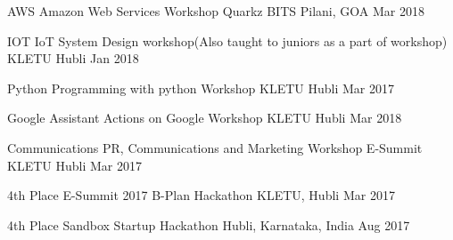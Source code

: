 




\begin{cvhonors}


\cvhonor
{AWS} %
{Amazon Web Services Workshop Quarkz} %
{BITS Pilani, GOA} %
{Mar 2018} %


\cvhonor
{IOT} %
{IoT System Design workshop(Also taught to juniors as a part of workshop)} %
{KLETU Hubli} %
{Jan 2018} %


\cvhonor
{Python} %
{Programming with python Workshop} %
{KLETU Hubli} %
{Mar 2017} %


\cvhonor
{Google Assistant} %
{Actions on Google Workshop} %
{KLETU Hubli} %
{Mar 2018} %


\cvhonor
{Communications} %
{PR, Communications and Marketing Workshop E-Summit} %
{KLETU Hubli} %
{Mar 2017} %


\end{cvhonors}



\begin{cvhonors}


\cvhonor
{4th Place} %
{E-Summit 2017 B-Plan Hackathon} %
{KLETU, Hubli} %
{Mar 2017} %


\cvhonor
{4th Place} %
{Sandbox Startup Hackathon} %
{Hubli, Karnataka, India} %
{Aug 2017} %


\end{cvhonors}

